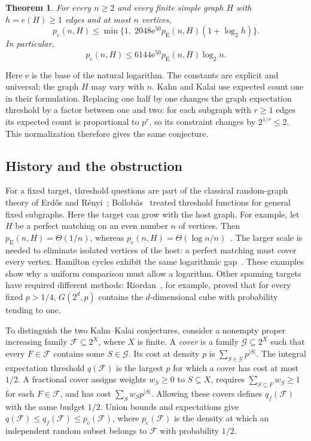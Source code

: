 \documentclass[11pt]{article}
\newtheorem{theorem}{Theorem}[section]
\numberwithin{equation}{section}
\newcommand{\pc}{p_{\mathrm c}}
\newcommand{\pE}{p_{\mathrm E}}
\newcommand{\ee}{\mathrm e}
\begin{document}
\begin{theorem}\label{thm:main}
For every $n\ge2$ and every finite simple graph $H$ with $h=e(H)\ge1$
edges and at most $n$ vertices,
\begin{equation}\label{eq:stronger}
 \pc(n,H)\le
 \min\{1,\;2048\ee^{50}\pE(n,H)(1+\log_2 h)\}.
\end{equation}
In particular,
\[
 \pc(n,H)\le6144\ee^{50}\pE(n,H)\log_2 n.
\]
\end{theorem}

Here $\ee$ is the base of the natural logarithm. The constants are
explicit and universal; the graph $H$ may vary with $n$.
Kahn and Kalai use expected count one in their formulation. Replacing
one half by one changes the graph expectation threshold by a factor
between one and two: for each subgraph with $r\ge1$ edges its expected
count is proportional to $p^r$, so its constraint changes by
$2^{1/r}\le2$. This normalization therefore gives the same conjecture.

\subsection{History and the obstruction}

For a fixed target, threshold questions are part of the classical
random-graph theory of Erd\H{o}s and R\'enyi~\cite{ER60};
Bollob\'as~\cite{Bollobas81} treated threshold functions for general
fixed subgraphs. Here the target can grow with the host graph.
For example, let $H$ be a perfect matching on an even number $n$ of
vertices. Then $\pE(n,H)=\Theta(1/n)$, whereas
$\pc(n,H)=\Theta(\log n/n)$~\cite{ER66,KK07}.
The larger scale is needed to eliminate isolated vertices of the host:
a perfect matching must cover every vertex. Hamilton cycles exhibit
the same logarithmic gap~\cite{KK07}. These examples show why a
uniform comparison must allow a logarithm. Other spanning targets have
required different methods: Riordan~\cite{Riordan00}, for example,
proved that for every fixed $p>1/4$, $G(2^d,p)$ contains the
$d$-dimensional cube with probability tending to one.

To distinguish the two Kahn--Kalai conjectures, consider a nonempty
proper increasing family $\mathcal F\subseteq2^X$, where $X$ is finite.
A \emph{cover} is a family $\mathcal G\subseteq2^X$ such that every
$F\in\mathcal F$ contains some $S\in\mathcal G$. Its cost at density
$p$ is $\sum_{S\in\mathcal G}p^{|S|}$. The integral expectation
threshold $q(\mathcal F)$ is the largest $p$ for which a cover has
cost at most $1/2$. A fractional cover assigns weights $w_S\ge0$
to $S\subseteq X$, requires $\sum_{S\subseteq F}w_S\ge1$ for each
$F\in\mathcal F$, and has cost $\sum_S w_Sp^{|S|}$. Allowing these
covers defines $q_f(\mathcal F)$ with the same budget $1/2$.
Union bounds and expectations give
$q(\mathcal F)\le q_f(\mathcal F)\le p_{\mathrm c}(\mathcal F)$,
where $p_{\mathrm c}(\mathcal F)$ is the density at which an independent
random subset belongs to $\mathcal F$ with probability $1/2$.
\end{document}
